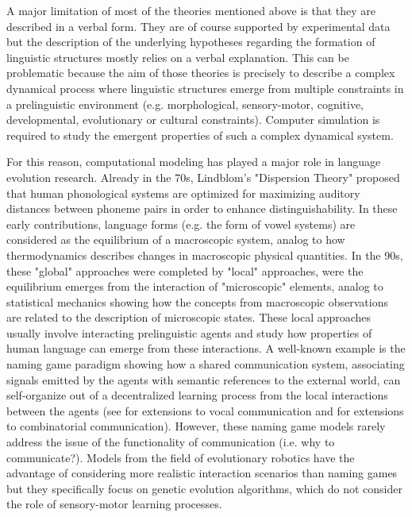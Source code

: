 \documentclass[letterpaper]{article} %
\begin{document}
A major limitation of most of the theories mentioned above is that they are described in a verbal form. They are of course supported by experimental data but the description of the underlying hypotheses regarding the formation of linguistic structures mostly relies on a verbal explanation. This can be problematic because the aim of those theories is precisely to describe a complex dynamical process where linguistic structures emerge from multiple constraints in a prelinguistic environment (e.g. morphological, sensory-motor, cognitive, developmental, evolutionary or cultural constraints). Computer simulation is required to study the emergent properties of such a complex dynamical system.

For this reason, computational modeling has played a major role in language evolution research. Already in the 70s, Lindblom's "Dispersion Theory" \cite{Liljencrants1972} proposed that human phonological systems are optimized for maximizing auditory distances between phoneme pairs in order to enhance distinguishability. In these early contributions, language forms (e.g. the form of vowel systems) are considered as the equilibrium of a macroscopic system, analog to how thermodynamics describes changes in macroscopic physical quantities. In the 90s, these "global" approaches were completed by "local" approaches, were the equilibrium emerges from the interaction of "microscopic" elements, analog to statistical mechanics showing how the concepts from macroscopic observations are related to the description of microscopic states. These local approaches usually involve interacting prelinguistic agents and study how properties of human language can emerge from these interactions. A well-known example is the naming game paradigm showing how a shared communication system, associating signals emitted by the agents with semantic references to the external world, can self-organize out of a decentralized learning process from the local interactions between the agents \cite{Steels97} (see \cite{deBoer2000,moulinfrier2015cosmo} for extensions to vocal communication and \cite{oudeyer2005self,Boer2010} for extensions to combinatorial communication). 
However, these naming game models rarely address the issue of the functionality of communication (i.e. why to communicate?). Models from the field of evolutionary robotics \cite{quinn2001evolving,Grouchy2016} have the advantage of considering more realistic interaction scenarios than naming games but they specifically focus on genetic evolution algorithms, which do not consider the role of sensory-motor learning processes. 
\end{document}
